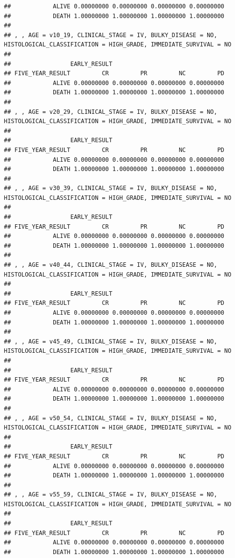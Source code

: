 \documentclass[]{article}
\begin{document}
\begin{verbatim}
##            ALIVE 0.00000000 0.00000000 0.00000000 0.00000000
##            DEATH 1.00000000 1.00000000 1.00000000 1.00000000
## 
## , , AGE = v10_19, CLINICAL_STAGE = IV, BULKY_DISEASE = NO, HISTOLOGICAL_CLASSIFICATION = HIGH_GRADE, IMMEDIATE_SURVIVAL = NO
## 
##                 EARLY_RESULT
## FIVE_YEAR_RESULT         CR         PR         NC         PD
##            ALIVE 0.00000000 0.00000000 0.00000000 0.00000000
##            DEATH 1.00000000 1.00000000 1.00000000 1.00000000
## 
## , , AGE = v20_29, CLINICAL_STAGE = IV, BULKY_DISEASE = NO, HISTOLOGICAL_CLASSIFICATION = HIGH_GRADE, IMMEDIATE_SURVIVAL = NO
## 
##                 EARLY_RESULT
## FIVE_YEAR_RESULT         CR         PR         NC         PD
##            ALIVE 0.00000000 0.00000000 0.00000000 0.00000000
##            DEATH 1.00000000 1.00000000 1.00000000 1.00000000
## 
## , , AGE = v30_39, CLINICAL_STAGE = IV, BULKY_DISEASE = NO, HISTOLOGICAL_CLASSIFICATION = HIGH_GRADE, IMMEDIATE_SURVIVAL = NO
## 
##                 EARLY_RESULT
## FIVE_YEAR_RESULT         CR         PR         NC         PD
##            ALIVE 0.00000000 0.00000000 0.00000000 0.00000000
##            DEATH 1.00000000 1.00000000 1.00000000 1.00000000
## 
## , , AGE = v40_44, CLINICAL_STAGE = IV, BULKY_DISEASE = NO, HISTOLOGICAL_CLASSIFICATION = HIGH_GRADE, IMMEDIATE_SURVIVAL = NO
## 
##                 EARLY_RESULT
## FIVE_YEAR_RESULT         CR         PR         NC         PD
##            ALIVE 0.00000000 0.00000000 0.00000000 0.00000000
##            DEATH 1.00000000 1.00000000 1.00000000 1.00000000
## 
## , , AGE = v45_49, CLINICAL_STAGE = IV, BULKY_DISEASE = NO, HISTOLOGICAL_CLASSIFICATION = HIGH_GRADE, IMMEDIATE_SURVIVAL = NO
## 
##                 EARLY_RESULT
## FIVE_YEAR_RESULT         CR         PR         NC         PD
##            ALIVE 0.00000000 0.00000000 0.00000000 0.00000000
##            DEATH 1.00000000 1.00000000 1.00000000 1.00000000
## 
## , , AGE = v50_54, CLINICAL_STAGE = IV, BULKY_DISEASE = NO, HISTOLOGICAL_CLASSIFICATION = HIGH_GRADE, IMMEDIATE_SURVIVAL = NO
## 
##                 EARLY_RESULT
## FIVE_YEAR_RESULT         CR         PR         NC         PD
##            ALIVE 0.00000000 0.00000000 0.00000000 0.00000000
##            DEATH 1.00000000 1.00000000 1.00000000 1.00000000
## 
## , , AGE = v55_59, CLINICAL_STAGE = IV, BULKY_DISEASE = NO, HISTOLOGICAL_CLASSIFICATION = HIGH_GRADE, IMMEDIATE_SURVIVAL = NO
## 
##                 EARLY_RESULT
## FIVE_YEAR_RESULT         CR         PR         NC         PD
##            ALIVE 0.00000000 0.00000000 0.00000000 0.00000000
##            DEATH 1.00000000 1.00000000 1.00000000 1.00000000

\end{verbatim}
\end{document}

